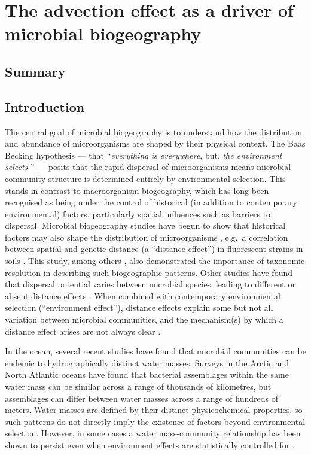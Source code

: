 \chapter[The advection effect]{The advection effect as a driver of microbial biogeography}
\label{ch:advection}


\section{Summary}

\section{Introduction}

The central goal of microbial biogeography is to understand how the distribution and abundance of microorganisms are shaped by their physical context.
The Baas Becking hypothesis --- that ``\textit{everything is everywhere}, but, \textit{the environment selects} \cite{Becking:1934um, deWit:2006de}'' --- posits that the rapid dispersal of microorganisms means microbial community structure is determined entirely by environmental selection.
This stands in contrast to macroorganism biogeography, which has long been recognised as being under the control of historical (in addition to contemporary environmental) factors, particularly spatial influences such as barriers to dispersal.
Microbial biogeography studies have begun to show that historical factors may also shape the distribution of microorganisms \cite{Martiny:2006jy}, e.g.\ a correlation between spatial and genetic distance (a ``distance effect'') in fluorescent  strains in soils \cite{Cho:2000tn}.
This study, among others \cite{Ramette:2007bb,Storch:2008tq}, also demonstrated the importance of taxonomic resolution in describing such biogeographic patterns.
Other studies have found that dispersal potential varies between microbial species, leading to different or absent distance effects \cite{Bissett:2010wj}.
When combined with contemporary environmental selection (``environment effect''), distance effects explain some but not all variation between microbial communities, and the mechanism(s) by which a distance effect arises are not always clear \cite{Hanson:2012cb}.

In the ocean, several recent studies have found that microbial communities can be endemic to hydrographically distinct water masses.
Surveys in the Arctic \cite{Galand:2009hy} and North Atlantic \cite{Agogue:2011fm} oceans have found that bacterial assemblages within the same water mass can be similar across a range of thousands of kilometres, but assemblages can differ between water masses across a range of hundreds of meters.
Water masses are defined by their distinct physicochemical properties, so such patterns do not directly imply the existence of factors beyond environmental selection.
However, in some cases a water mass-community relationship has been shown to persist even when environment effects are statistically controlled for \cite{Hamilton:2008tp, Hamdan:2013ko}.

